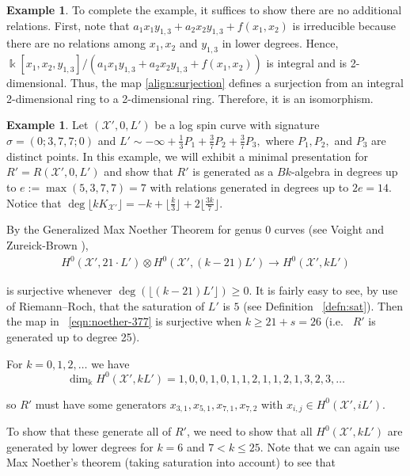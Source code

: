 \documentclass{amsart}
\theoremstyle{plain}
\theoremstyle{definition}
\newtheorem{example}[thm]{Example}
\theoremstyle{remark}
\numberwithin{equation}{section}
\newcommand\Bk{{\Bbbk}}
\newcommand\sx{\mathscr X}
\newcommand{\halfcan}{L}
\begin{document}
\begin{example}
To complete the example, it suffices to show there are no
additional relations. First, note that $a_1 x_1 y_{1, 3} + a_2 x_2
y_{1, 3} + f(x_1, x_2)$ is irreducible because there are no
relations among $x_1, x_2$ and $y_{1, 3}$ in lower degrees. Hence,
$\Bk[x_1, x_2, y_{1, 3}] / (a_1 x_1 y_{1, 3} + a_2 x_2 y_{1, 3} +
f(x_1, x_2))$ is integral and is 2-dimensional. Thus, the map
\eqref{align:surjection} defines a surjection from an integral
2-dimensional ring to a 2-dimensional ring. Therefore, it is an 
isomorphism.
\end{example}

\begin{example}
\label{eg:base-0-377}
Let $(\sx', 0, \halfcan')$ be a log spin curve with signature $\sigma =
(0; 3, 7, 7; 0)$ and $\halfcan' \sim -\infty + \frac{1}{3} P_1 +
\frac{3}{7} P_2 + \frac{3}{7} P_3,$ where $P_1, P_2,$ and $P_3$ are
distinct points. In this example, we will exhibit a minimal
presentation for $R' = R(\sx', 0, \halfcan')$ and show that $R'$ is
generated as a $Bk$-algebra in degrees up to $e := \max(5, 3, 7, 7) = 7$
with relations generated in degrees up to $2e = 14$.
Notice that $\deg \lfloor k K_{\sx'} \rfloor= -k + \lfloor \frac{k}{3}
\rfloor + 2 \lfloor \frac{3k}{7} \rfloor$.

By the Generalized Max Noether Theorem for genus 0 curves (see Voight
and Zureick-Brown \cite[Lemma 3.1.1]{vzb:stacky}),
\begin{align}
\label{eqn:noether-377}
	H^0 (\sx', 21 \cdot \halfcan') \otimes H^0 (\sx',
	(k - 21) \halfcan') \rightarrow H^0 (\sx',
	k \halfcan')
\end{align}

\noindent
is surjective whenever $\deg (\lfloor (k - 21) \halfcan' \rfloor)
\geq 0$. It is fairly easy to see, by use of Riemann--Roch, that
the saturation of $\halfcan'$ is $5$ (see Definition ~\ref{defn:sat}).
Then the map in ~\eqref{eqn:noether-377} is surjective when $k \geq
21 + s = 26$ (i.e.~ $R'$ is generated up to degree 25).

For $k = 0, 1, 2, \ldots$ we have
\[
	\dim_\Bk H^0 (\sx', k \halfcan') = 1, 0, 0, 1, 0, 1, 1, 2, 1, 1, 2, 1, 3, 2, 3, \ldots
\]

\noindent
so $R'$ must have some generators $x_{3, 1}, x_{5, 1}, x_{7, 1},
x_{7, 2}$ with $x_{i, j} \in H^0(\sx', i \halfcan')$.

To show that these generate all of $R'$, we need to show that all
$H^0 (\sx', k \halfcan')$ are generated by lower degrees for $k = 6$
and $7 < k \leq 25$. Note that we can again use Max Noether's theorem
(taking saturation into account) to see that


\end{example}
\end{document}
